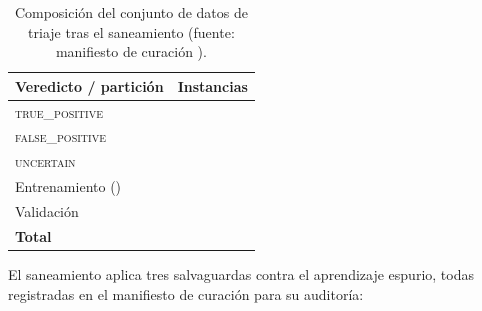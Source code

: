 \begin{table}[t]
  \centering
  \caption{Composición del conjunto de datos de triaje tras el saneamiento
  (fuente: manifiesto de curación ).}
  \label{tab:ia-dataset}
  \footnotesize
  \begin{tabular}{lr}
    \toprule
    Veredicto / partición & Instancias \\
    \midrule
    \textsc{true\_positive}   & \IATriajeTP{}  \\
    \textsc{false\_positive}  & \IATriajeFP{}  \\
    \textsc{uncertain}        & \IATriajeUNC{} \\
    \midrule
    Entrenamiento (\IATriajeSplit{})      & \IATriajeTrain{} \\
    Validación                            & \IATriajeVal{}   \\
    \midrule
    \textbf{Total}            & \textbf{\IADatasetTriaje{}} \\
    \bottomrule
  \end{tabular}
\end{table}

El saneamiento aplica tres salvaguardas contra el aprendizaje espurio, todas
registradas en el manifiesto de curación para su auditoría:

